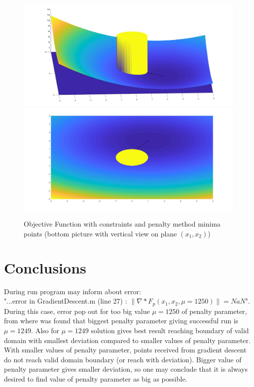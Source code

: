 \documentclass[main.tex]{subfiles}
\begin{document}
\begin{figure}[h]
\centering
\includegraphics[width=\textwidth]{PenaltyMethod/PenaltyMethod_solved.jpg}
\includegraphics[width=\textwidth]{PenaltyMethod/PenaltyMethod_solved_view(0,90)_.jpg}
\label{fig:solution}
\caption{Objective Function with constraints and penalty method minima points (bottom picture with vertical view on plane $(x_1,x_2)$)}
\end{figure}

\newpage
\section{Conclusions}

 During run program may inform about error:\\
 "...error in GradientDescent.m (line 27) : $\|\nabla*F_p(x_1, x_2, \mu=1250)\| = NaN$".\\
 
 During this case, error pop out for too big value $\mu=1250$ of penalty parameter, from where was found that biggest penalty parameter giving successful run is $\mu=1249$. Also for $\mu=1249$ solution gives best result reaching boundary of valid domain with smallest deviation compared to smaller values of penalty parameter. With smaller values of penalty parameter, points received from gradient descent do not reach valid domain boundary (or reach with deviation). Bigger value of penalty parameter gives smaller deviation, so one may conclude that it is always desired to find value of penalty parameter as big as possible. \\
\end{document}

